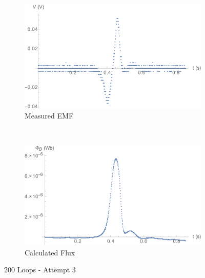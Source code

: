 \documentclass[a4paper]{scrartcl}
\begin{document}
\begin{figure}[p]
    \centering
    \begin{subfigure}[b]{0.45\textwidth}
        \includegraphics[width = \textwidth]{200_3_voltage.png}
        \caption{Measured EMF}
    \end{subfigure}
    ~
    \begin{subfigure}[b]{0.45\textwidth}
        \includegraphics[width = \textwidth]{200_3_flux.png}
        \caption{Calculated Flux}
    \end{subfigure}
    \caption{200 Loops - Attempt 3}
    \label{fig:200_3}
\end{figure}
\end{document}
